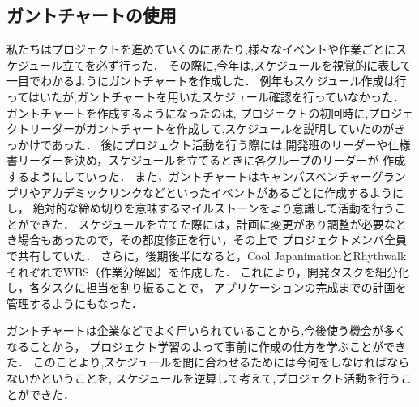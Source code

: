 \subsection{ガントチャートの使用}
\par
私たちはプロジェクトを進めていくのにあたり,様々なイベントや作業ごとにスケジュール立てを必ず行った．
その際に,今年は,スケジュールを視覚的に表して一目でわかるようにガントチャートを作成した．
例年もスケジュール作成は行ってはいたが,ガントチャートを用いたスケジュール確認を行っていなかった．
ガントチャートを作成するようになったのは,
プロジェクトの初回時に,プロジェクトリーダーがガントチャートを作成して,スケジュールを説明していたのがきっかけであった．
後にプロジェクト活動を行う際には,開発班のリーダーや仕様書リーダーを決め，スケジュールを立てるときに各グループのリーダーが
作成するようにしていった．
また，ガントチャートはキャンパスベンチャーグランプリやアカデミックリンクなどといったイベントがあるごとに作成するようにし，
絶対的な締め切りを意味するマイルストーンをより意識して活動を行うことができた．
スケジュールを立てた際には，計画に変更があり調整が必要なとき場合もあったので，その都度修正を行い，その上で
プロジェクトメンバ全員で共有していた．
さらに，後期後半になると，Cool JapanimationとRhythwalkそれぞれでWBS（作業分解図）を作成した．
これにより，開発タスクを細分化し，各タスクに担当を割り振ることで，
アプリケーションの完成までの計画を管理するようにもなった．
\par
ガントチャートは企業などでよく用いられていることから,今後使う機会が多くなることから，
プロジェクト学習のよって事前に作成の仕方を学ぶことができた．
このことより,スケジュールを間に合わせるためには今何をしなければならないかということを,
スケジュールを逆算して考えて,プロジェクト活動を行うことができた．
